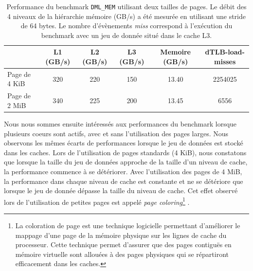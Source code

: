     \begin{table}[]
    \centering
    \begin{tabular}{l|c|c|c|c|c|}
    \cline{2-6}
     & \cellcolor[HTML]{EFEFEF}L1 (GB/s) & \cellcolor[HTML]{EFEFEF}L2 (GB/s) & \cellcolor[HTML]{EFEFEF}L3 (GB/s) & \cellcolor[HTML]{EFEFEF}Memoire (GB/s) & \cellcolor[HTML]{EFEFEF}dTLB-load-misses \\ \hline
    \multicolumn{1}{|l|}{\cellcolor[HTML]{EFEFEF}Page de 4 KiB} & 320 & 220 & 150 & 13.40 & 2254025 \\ \hline
    \multicolumn{1}{|l|}{\cellcolor[HTML]{EFEFEF}Page de 2 MiB} & 340 & 225 & 200 & 13.45 & 6556 \\ \hline
    \end{tabular}%
    \caption{Performance du benchmark \texttt{DML\_MEM} utilisant deux tailles de pages. Le débit des 4 niveaux de la hiérarchie mémoire (GB/s) a été mesurée en utilisant une stride de 64 bytes. Le nombre d'évènements \textit{miss} correspond à l'exécution du benchmark avec un jeu de donnée situé dans le cache L3.}
    \label{tab:large_page_memory}
    \end{table}
    
    
    Nous nous sommes ensuite intéressés aux performances du benchmark lorsque plusieurs coeurs sont actifs, avec et sans l'utilisation des pages larges. Nous observons les mêmes écarts de performances lorsque le jeu de données est stocké dans les caches. Lors de l'utilisation de pages standards (4 KiB), nous constatons que lorsque la taille du jeu de données approche de la taille d'un niveau de cache, la performance commence à se détériorer. Avec l'utilisation des pages de 4 MiB, la performance dans chaque niveau de cache est constante et ne se détériore que lorsque le jeu de donnée dépasse la taille du niveau de cache. Cet effet observé lors de l'utilisation de petites pages est appelé \textit{page coloring}\footnote{La coloration de page est une technique logicielle permettant d'améliorer le mappage d'une page de la mémoire physique sur les lignes de cache du processeur. Cette technique permet d'assurer que des pages contiguës en mémoire virtuelle sont allouées à des pages physiques qui se répartiront efficacement dans les caches.} \cite{Zhang2009}.
  

